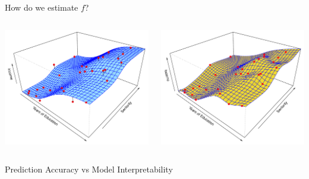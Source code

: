 \documentclass[14pt]{beamer}
\begin{document}
\begin{frame}{How do we estimate $f$?}
\vspace{.5cm}

  \begin{columns}
    \begin{column}{0.5\textwidth}
      \centering
      \includegraphics[width = \textwidth]{2-3.pdf}
    \end{column}
    \begin{column}{0.5\textwidth}
      \centering
      \includegraphics[width = \textwidth]{2-6.pdf}
    \end{column}
  \end{columns}
\end{frame}


\begin{frame}{\normalsize Prediction Accuracy vs Model
Interpretability}


\end{frame}
\end{document}
